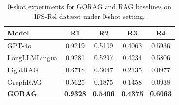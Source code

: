 \begin{table}[t]
	\centering
	\caption{0-shot experiments for GORAG and RAG baselines on IFS-Rel dataset under 0-shot setting.}
	\label{tab:gorag:zero}
	
	\small
		\begin{tabular}{l|c|c|c|c} 
			\hline\hline
			\textbf{Model}          & \textbf{R1}              & \textbf{R2}              & \textbf{R3}              & \textbf{R4}               \\ 
			\hline
			GPT-4o \cite{gorag-hurst2024gpt}                  & 0.9219                   & 0.5109                   & 0.4063                   & \underline{0.5936}                    \\ 
			LongLLMLingua \cite{gorag-jiang-etal-2024-longllmlingua}          & \underline{0.9281}                   & \underline{0.5297}                   & \underline{0.4234}                   & 0.5806                    \\
			LightRAG \cite{gorag-guo2024lightrag}                & 0.6718                   & 0.3047                   & 0.2135                   & 0.0977                    \\ 
			GraphRAG \cite{gorag-edge2024local}                & 0.5625                   & 0.1875                   & 0.1458                   & 0.0938                    \\
			\textbf{\textbf{GORAG}} & \textbf{\textbf{0.9328}} & \textbf{\textbf{0.5406}} & \textbf{\textbf{0.4375}} & \textbf{\textbf{0.6063}}  \\
			\hline\hline
		\end{tabular}
	
\end{table}
